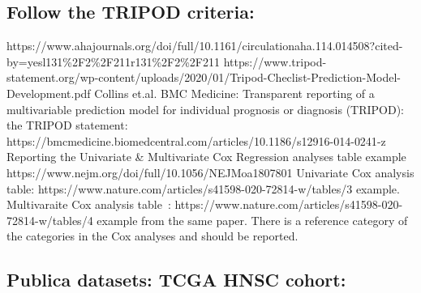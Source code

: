 \documentclass{article}%
\begin{document}
\subsection{Follow the TRIPOD criteria: }%
\label{subsec:FollowtheTRIPODcriteria}%

%
https://www.ahajournals.org/doi/full/10.1161/circulationaha.114.014508?cited{-}by=yesl131\%2F2\%2F211r131\%2F2\%2F211%
\newline%
\newline%
%
https://www.tripod{-}statement.org/wp{-}content/uploads/2020/01/Tripod{-}Checlist{-}Prediction{-}Model{-}Development.pdf %
\newline%
\newline%
%
Collins et.al. BMC Medicine: Transparent reporting of a multivariable prediction model for individual prognosis or diagnosis (TRIPOD): the TRIPOD statement: https://bmcmedicine.biomedcentral.com/articles/10.1186/s12916{-}014{-}0241{-}z %
\newline%
\newline%
%
Reporting the Univariate \& Multivariate Cox Regression analyses table example %
\newline%
\newline%
%
https://www.nejm.org/doi/full/10.1056/NEJMoa1807801%
\newline%
\newline%
%
%
\newline%
\newline%
%
Univariate Cox analysis table: https://www.nature.com/articles/s41598{-}020{-}72814{-}w/tables/3 example. %
\newline%
\newline%
%
Multivaraite Cox analysis table~: https://www.nature.com/articles/s41598{-}020{-}72814{-}w/tables/4 example from the same paper. There is a reference category of the categories in the Cox analyses and should be reported.%
\newline%
\newline%
%
%
\newline%
\newline%
%
\subsection{Publica datasets: TCGA HNSC cohort:}%
\label{subsec:PublicadatasetsTCGAHNSCcohort}%
\end{document}
